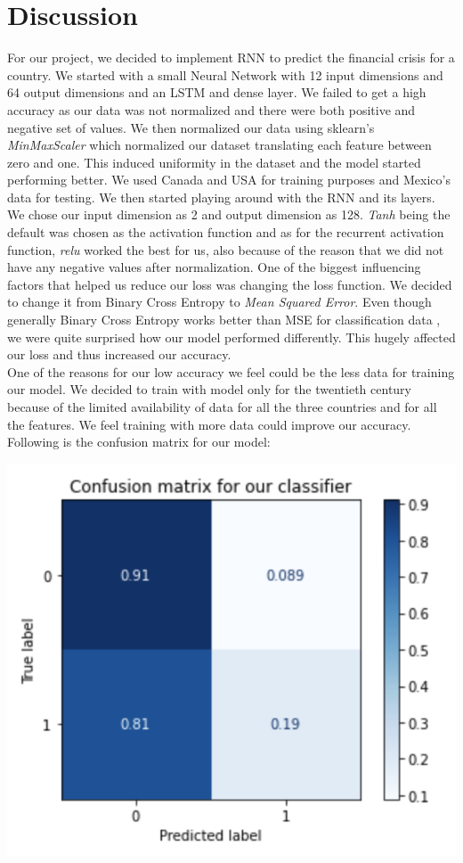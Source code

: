 \documentclass[12pt]{article}
\begin{document}
\section{Discussion}
For our project, we decided to implement RNN to predict the financial crisis for a country. We started with a small Neural Network with 12 input dimensions and 64 output dimensions and an LSTM and dense layer. We failed to get a high accuracy as our data was not normalized and there were both positive and negative set of values. We then normalized our data using sklearn's \textit{MinMaxScaler} which normalized our dataset translating each feature between zero and one. This induced uniformity in the dataset and the model started performing better. We used Canada and USA for training purposes and Mexico's data for testing. We then started playing around with the RNN and its layers. We chose our input dimension as 2 and output dimension as 128. \textit{Tanh} being the default was chosen as the activation function and as for the recurrent activation function, \textit{relu} worked the best for us, also because of the reason that we did not have any negative values after normalization. One of the biggest influencing factors that helped us reduce our loss was changing the loss function. We decided to change it from Binary Cross Entropy to \textit{Mean Squared Error}. Even though generally Binary Cross Entropy works better than MSE for classification data \cite{Shiva:2019}, we were quite surprised how our model performed differently. This hugely affected our loss and thus increased our accuracy.\\
One of the reasons for our low accuracy we feel could be the less data for training our model. We decided to train with model only for the twentieth century because of the limited availability of data for all the three countries and for all the features. We feel training with more data could improve our accuracy.\\
Following is the confusion matrix for our model: \\
\begin{center}
\includegraphics[scale=0.8]{ConfusionMatrix.png}\\
\end{center}
\end{document}
